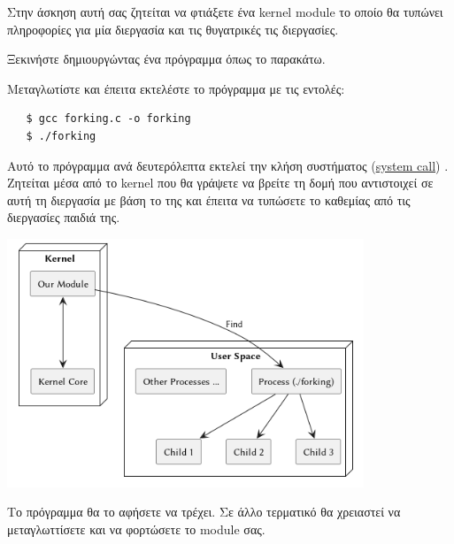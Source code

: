 \documentclass[18pt]{extarticle}
\begin{document}
\begin{question}
   Στην άσκηση αυτή σας ζητείται να φτιάξετε ένα kernel module το οποίο θα τυπώνει πληροφορίες για μία διεργασία και τις θυγατρικές τις διεργασίες.
   
   Ξεκινήστε δημιουργώντας ένα πρόγραμμα όπως το παρακάτω.

    \begin{file}[forking.c]
        \footnotesize 
    \end{file}

    Μεταγλωτίστε και έπειτα εκτελέστε το πρόγραμμα με τις εντολές:

   \begin{commandline}
       \begin{verbatim}
   $ gcc forking.c -o forking
   $ ./forking
       \end{verbatim}
   \end{commandline}

    Αυτό το πρόγραμμα ανά  δευτερόλεπτα εκτελεί την κλήση συστήματος (\href{https://man7.org/linux/man-pages/man2/syscalls.2.html}{system call}) .
    Ζητείται μέσα από το kernel που θα γράψετε να βρείτε τη δομή  που αντιστοιχεί 
    σε αυτή τη διεργασία με βάση το  της και έπειτα να τυπώσετε το  καθεμίας από τις διεργασίες παιδιά της.

    \begin{center}
        \centering
        \includegraphics[width=0.8\textwidth]{assets/process.png}
    \end{center}

    Το πρόγραμμα  θα το αφήσετε να τρέχει. Σε άλλο τερματικό θα χρειαστεί να μεταγλωττίσετε και να φορτώσετε το module σας.


\end{question}
\end{document}
